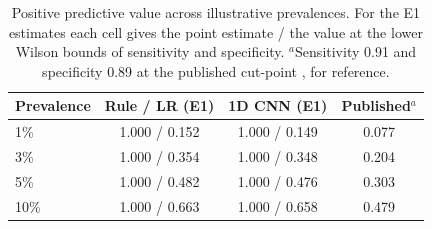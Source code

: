 \begin{table}[t]
\centering
\caption{Positive predictive value across illustrative prevalences. For the E1 estimates each cell gives the point estimate / the value at the lower Wilson bounds of sensitivity and specificity. $^{a}$Sensitivity 0.91 and specificity 0.89 at the published cut-point \cite{allison2012}, for reference.}
\label{tab:ppv}
\footnotesize
\setlength{\tabcolsep}{4pt}
\begin{tabular}{lccc}
\toprule
Prevalence & Rule / LR (E1) & 1D CNN (E1) & Published$^{a}$ \\
\midrule
1\% & 1.000 / 0.152 & 1.000 / 0.149 & 0.077 \\
3\% & 1.000 / 0.354 & 1.000 / 0.348 & 0.204 \\
5\% & 1.000 / 0.482 & 1.000 / 0.476 & 0.303 \\
10\% & 1.000 / 0.663 & 1.000 / 0.658 & 0.479 \\
\bottomrule
\end{tabular}
\end{table}